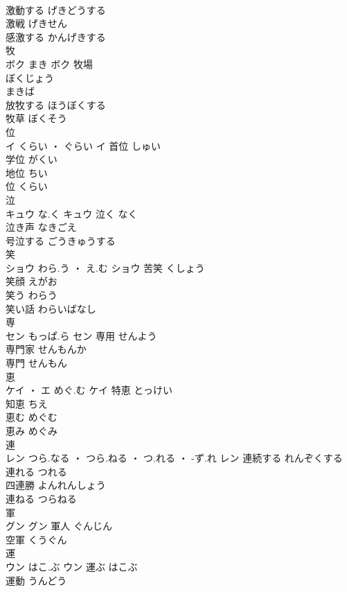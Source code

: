 \documentclass[8pt]{extreport}
\begin{document}
\begin{CJK}{UTF8}{min}
\\	激動する	げきどうする	
\\	激戦	げきせん	
\\	感激する	かんげきする	
\\	牧	
\\	ボク	まき	ボク	牧場 
\\	ぼくじょう 
\\	まきば	
\\	放牧する	ほうぼくする	
\\	牧草	ぼくそう	
\\	位	
\\	イ	くらい ・ ぐらい	イ	首位	しゅい	
\\	学位	がくい	
\\	地位	ちい	
\\	位	くらい	
\\	泣	
\\	キュウ	な.く	キュウ													泣く	なく	
\\	泣き声	なきごえ	
\\	号泣する	ごうきゅうする	
\\	笑	
\\	ショウ	わら.う ・ え.む	ショウ	苦笑	くしょう	
\\	笑顔	えがお	
\\	笑う	わらう	
\\	笑い話	わらいばなし	
\\	専	
\\	セン	もっぱ.ら	セン	専用	せんよう	
\\	専門家	せんもんか	
\\	専門	せんもん	
\\	恵	
\\	ケイ ・ エ	めぐ.む	ケイ	特恵	とっけい	
\\	知恵	ちえ	
\\	恵む	めぐむ	
\\	恵み	めぐみ	
\\	連	
\\	レン	つら.なる ・ つら.ねる ・ つ.れる ・ -ず.れ	レン	連続する	れんぞくする	
\\	連れる	つれる	
\\	四連勝	よんれんしょう	
\\	連ねる	つらねる	
\\	軍	
\\	グン		グン	軍人	ぐんじん	
\\	空軍	くうぐん	
\\	運	
\\	ウン	はこ.ぶ	ウン	運ぶ	はこぶ	
\\	運動	うんどう	

\end{CJK}
\end{document}
